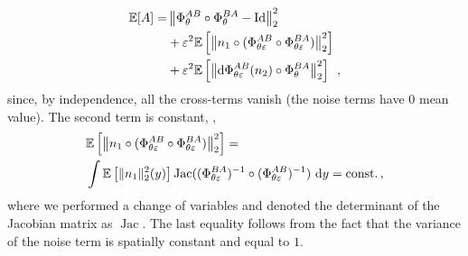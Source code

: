 \begin{equation}
  \begin{split}
   \mathbb{E}[A] = & \left\| \Phi_{\theta}^{AB} \circ \Phi_{\theta}^{BA} - \operatorname{Id} \right\|^2_2  \\
   & + \varepsilon^2 \mathbb{E}\left[\left\|n_1\circ(\Phi_{\theta \varepsilon}^{AB} \circ \Phi_{\theta \varepsilon}^{BA})\right\|^2_2\right] \\ 
   & + \varepsilon^2\mathbb{E}\left[\left\|\mathrm{d}\Phi_{\theta \varepsilon}^{AB}( n_2) \circ \Phi_{\theta}^{BA} \right\|^2_2\right]\enspace,
  \end{split}
  \label{eqn:expectation_of_A}
\end{equation}
since, by independence, all the cross-terms vanish (the noise terms have $0$ mean value).
The second term is constant, \ie,
\begin{alignat}{1}
  &\mathbb{E}\left[\left\|n_1\circ(\Phi_{\theta \varepsilon}^{AB} \circ \Phi_{\theta \varepsilon}^{BA})\right\|^2_2\right] =
  \\
  &\int \mathbb{E}\left[\|n_1\|^2_2(y)\right] \operatorname{Jac}((\Phi_{\theta \varepsilon}^{BA})^{-1} \circ (\Phi_{\theta \varepsilon}^{AB})^{-1})~\mathrm{d}y= \text{const.} \,, \notag
\end{alignat}
where we performed a change of variables and denoted the determinant of the Jacobian matrix as $\operatorname{Jac}$. The last equality follows from the fact that the variance of the noise term is spatially constant and equal to $1$. %
